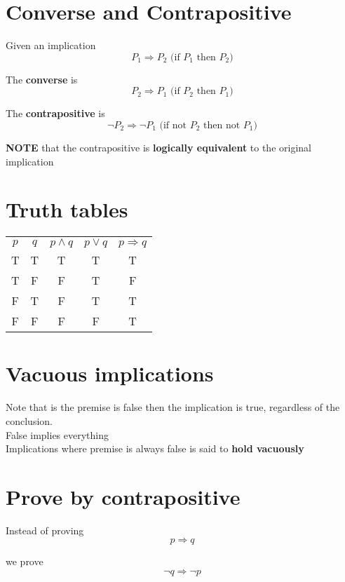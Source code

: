 \section{Converse and Contrapositive}

Given an implication
\[
   P_1 \Rightarrow P_2 \text{ (if $P_1$ then $P_2$)}
\] 

The \textbf{converse} is
\[
  P_2 \Rightarrow P_1 \text{ (if $P_2$ then $P_1$)}
\] 

The \textbf{contrapositive} is 
\[
  \lnot P_2 \Rightarrow \lnot P_1 \text{ (if not $P_2$ then not $P_1$)}
\] 

\textbf{NOTE} that the contrapositive is \textbf{logically equivalent} to the original implication

\section{Truth tables}

\begin{center}
   \begin{tabular}{| c | c | c | c | c |}
      $p$ & $q$ & $p \land q$ & $p \lor q$ & $p \Rightarrow q$ \\
      T & T & T & T & T \\
      T & F & F & T & F \\
      F & T & F & T & T \\
      F & F & F & F & T
   \end{tabular}
\end{center}


\section{Vacuous implications}

Note that is the premise is false then the implication is true, regardless of the conclusion. \\ 

False implies everything \\

Implications where premise is always false is said to \textbf{hold vacuously}

\section{Prove by contrapositive}

Instead of proving 
\[
  p \Rightarrow q
\] 

we prove
\[
  \lnot q \Rightarrow \lnot p
\] 

